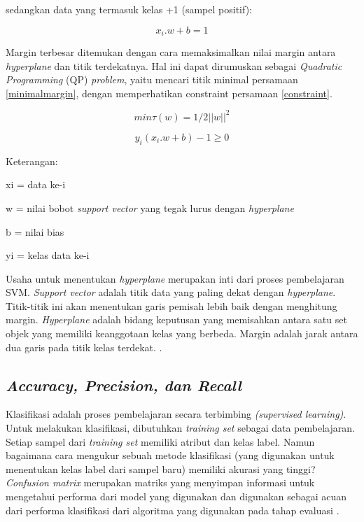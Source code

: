 sedangkan data yang termasuk kelas +1 (sampel positif):

\begin{equation}
	x_i.w + b = 1
\end{equation}

Margin terbesar ditemukan dengan cara memaksimalkan nilai margin antara \textit{hyperplane} dan titik terdekatnya. Hal ini dapat dirumuskan sebagai \textit{Quadratic Programming} (QP) \textit{problem}, yaitu mencari titik minimal persamaan \ref{minimalmargin}, dengan memperhatikan constraint persamaan \ref{constraint}.

\begin{equation}
	min \tau(w) = 1/2||w||^{2}
	\label{minimalmargin}
\end{equation}


\begin{equation}
	y_i(x_i.w + b) - 1 \ge 0
	\label{constraint}
\end{equation}

\par Keterangan:
\par xi = data ke-i
\par w = nilai bobot \textit{support vector} yang tegak lurus dengan \textit{hyperplane}
\par b = nilai bias
\par yi = kelas data ke-i


\par Usaha untuk menentukan \textit{hyperplane} merupakan inti dari proses pembelajaran SVM. \textit{Support vector} adalah titik data yang paling dekat dengan \textit{hyperplane}. Titik-titik ini akan menentukan garis pemisah lebih baik dengan menghitung margin. \textit{Hyperplane} adalah bidang keputusan yang memisahkan antara satu set objek yang memiliki keanggotaan kelas yang berbeda. Margin adalah jarak antara dua garis pada titik kelas terdekat. \citep{Zhibin2008}.


\subsection{\textit{Accuracy, Precision, dan Recall}}
\par Klasifikasi adalah proses pembelajaran secara
terbimbing \textit{(supervised learning)}. Untuk melakukan klasifikasi, dibutuhkan \textit{training set} sebagai data pembelajaran. Setiap sampel dari \textit{training set} memiliki atribut dan kelas label. Namun bagaimana cara mengukur sebuah metode klasifikasi (yang digunakan untuk menentukan kelas label dari sampel baru) memiliki akurasi yang tinggi? \textit{Confusion matrix} merupakan matriks yang menyimpan informasi untuk mengetahui performa dari model yang digunakan dan digunakan sebagai acuan dari performa klasifikasi dari algoritma yang digunakan pada tahap evaluasi \citep{Ariza18}.

